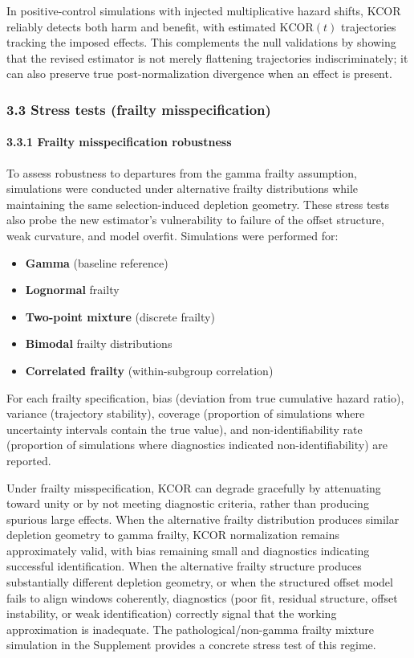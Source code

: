 \documentclass[
]{article}
\providecommand{\tightlist}{%
  \setlength{\itemsep}{0pt}\setlength{\parskip}{0pt}}
\begin{document}
In positive-control simulations with injected multiplicative hazard
shifts, KCOR reliably detects both harm and benefit, with estimated
\(\mathrm{KCOR}(t)\) trajectories tracking the imposed effects. This
complements the null validations by showing that the revised estimator
is not merely flattening trajectories indiscriminately; it can also
preserve true post-normalization divergence when an effect is present.

\subsubsection{3.3 Stress tests (frailty
misspecification)}\label{stress-tests-frailty-misspecification}

\paragraph{3.3.1 Frailty misspecification
robustness}\label{frailty-misspecification-robustness}

To assess robustness to departures from the gamma frailty assumption,
simulations were conducted under alternative frailty distributions while
maintaining the same selection-induced depletion geometry. These stress
tests also probe the new estimator's vulnerability to failure of the
offset structure, weak curvature, and model overfit. Simulations were
performed for:

\begin{itemize}
\tightlist
\item
  \textbf{Gamma} (baseline reference)
\item
  \textbf{Lognormal} frailty
\item
  \textbf{Two-point mixture} (discrete frailty)
\item
  \textbf{Bimodal} frailty distributions
\item
  \textbf{Correlated frailty} (within-subgroup correlation)
\end{itemize}

For each frailty specification, bias (deviation from true cumulative
hazard ratio), variance (trajectory stability), coverage (proportion of
simulations where uncertainty intervals contain the true value), and
non-identifiability rate (proportion of simulations where diagnostics
indicated non-identifiability) are reported.

Under frailty misspecification, KCOR can degrade gracefully by
attenuating toward unity or by not meeting diagnostic criteria, rather
than producing spurious large effects. When the alternative frailty
distribution produces similar depletion geometry to gamma frailty, KCOR
normalization remains approximately valid, with bias remaining small and
diagnostics indicating successful identification. When the alternative
frailty structure produces substantially different depletion geometry,
or when the structured offset model fails to align windows coherently,
diagnostics (poor fit, residual structure, offset instability, or weak
identification) correctly signal that the working approximation is
inadequate. The pathological/non-gamma frailty mixture simulation in the
Supplement provides a concrete stress test of this regime.
\end{document}
